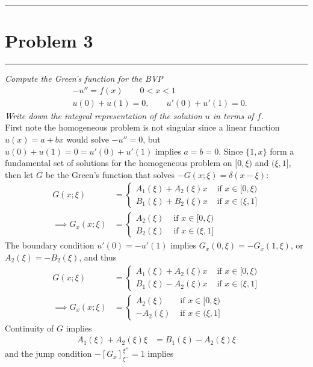 \documentclass{article} %
\theoremstyle{plain}
\newcommand{\problem}[1]{
\vspace{.375cm}
\begin{minipage}{\textwidth}
    \begin{center}
        \noindent\rule{5cm}{1pt}
    \end{center}
    \section{\bf #1}
    \begin{center}
        \noindent\rule{5cm}{1pt}
    \end{center}
    \vspace{0.25cm}
\end{minipage}
}
\begin{document}
\problem{Problem 3}
\emph{Compute the Green's function for the BVP
\begin{align*}
&-u'' = f(x)\qquad 0<x<1
\\
&u(0)+u(1)=0,\qquad u'(0)+u'(1)=0.
\end{align*}
Write down the integral representation of the solution $u$ in terms of $f$.} \\

First note the homogeneous problem is not singular since a linear function $u(x) = a + bx$ would solve $-u'' = 0$, but $u(0) + u(1) = 0 = u'(0) + u'(1)$ implies $a = b = 0$.  Since $\{1, x\}$ form a fundamental set of solutions for the homogeneous problem on $[0, \xi)$ and $(\xi, 1]$, then let $G$ be the Green's function that solves $-G(x;\xi) = \delta(x - \xi)$:
\begin{align*}
    G(x;\xi) &= \begin{cases}
        A_1(\xi) + A_2(\xi)x & \text{ if } x \in [0, \xi) \\
        B_1(\xi) + B_2(\xi)x & \text{ if } x \in (\xi, 1]
    \end{cases} \\
    \implies G_x(x;\xi) &= \begin{cases}
        A_2(\xi) & \text{ if } x \in [0, \xi) \\
        B_2(\xi) & \text{ if } x \in (\xi, 1]
    \end{cases}
\end{align*}
The boundary condition $u'(0) = -u'(1)$ implies $G_x(0, \xi) = -G_x(1, \xi)$, or $A_2(\xi) = -B_2(\xi)$, and thus
\begin{align*}
    G(x;\xi) &= \begin{cases}
        A_1(\xi) + A_2(\xi)x & \text{ if } x \in [0, \xi) \\
        B_1(\xi) - A_2(\xi)x & \text{ if } x \in (\xi, 1]
    \end{cases} \\
    \implies G_x(x;\xi) &= \begin{cases}
        A_2(\xi) & \text{ if } x \in [0, \xi) \\
        -A_2(\xi) & \text{ if } x \in (\xi, 1]
    \end{cases}
\end{align*}
Continuity of $G$ implies
\begin{align*}
    A_1(\xi) + A_2(\xi)\xi &= B_1(\xi) - A_2(\xi)\xi
\end{align*}
and the jump condition $-[G_x]_{\xi^-}^{\xi^+} = 1$ implies
\end{document}
